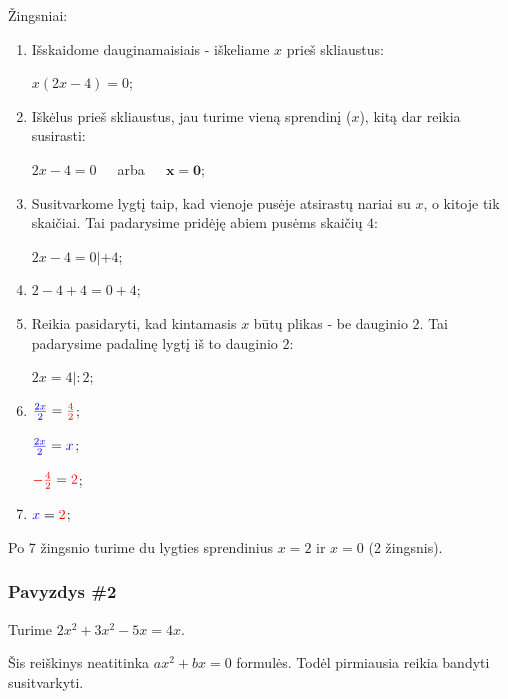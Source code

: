 \documentclass[a4paper]{article}
\begin{document}
Žingsniai: 
\begin{enumerate}

    \item  Išskaidome dauginamaisiais - iškeliame $ x $ prieš skliaustus:

    $ x(2x - 4) = 0 $;
    \item  Iškėlus prieš skliaustus, jau turime vieną sprendinį ($ x $), kitą dar reikia susirasti:

   $ 2x-4 = 0 $ $\;\;\;$ arba $\;\;\;$ $ \boldsymbol{x=0} $;
   \item  Susitvarkome lygtį taip, kad vienoje pusėje atsirastų nariai su $ x $, o kitoje tik skaičiai. Tai padarysime pridėję abiem pusėms skaičių $ 4 $:

   $ 2x-4 = 0 | + 4 $;
   \item  $ 2-4+4 = 0+4 $;
\item Reikia pasidaryti, kad kintamasis $ x $ būtų plikas - be dauginio $ 2 $. Tai padarysime padalinę lygtį iš to dauginio $ 2 $:

    $ 2x = 4 | : 2 $;
    \item $ \textcolor{blue}{\frac{2x}{2}} = \textcolor{red}{\frac{4}{2}} $;

    $ \textcolor{blue}{\frac{2x}{2}}=\textcolor{blue}{x} $;
   
    $ \textcolor{red}{-\frac{4}{2}}=\textcolor{red}{2} $;
   
 \item $ \textcolor{blue}{x} = \textcolor{red}{2} $;
\end{enumerate}

Po 7 žingsnio turime du lygties sprendinius $ x = 2 $ ir $ x=0 $ (2 žingsnis).

\subsubsection{Pavyzdys \#2}

Turime $ 2x^2 + 3x^2 - 5x = 4x $. 

Šis reiškinys neatitinka $ ax^{2}+ bx = 0 $ formulės. Todėl pirmiausia reikia bandyti susitvarkyti.
\end{document}
